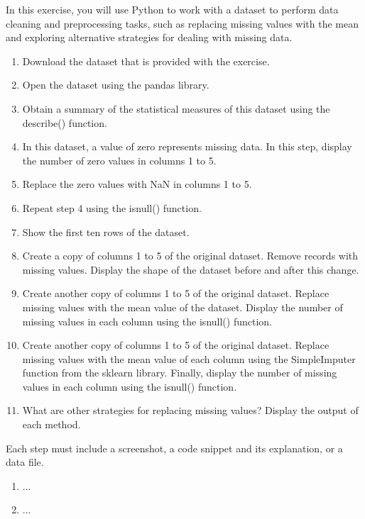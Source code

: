 \begin{question}
	In this exercise, you will use Python to work with a dataset to perform data cleaning and preprocessing tasks, such as replacing missing values with the mean and exploring alternative strategies for dealing with missing data.
	\begin{enumerate}
		\item Download the dataset that is provided with the exercise.
		\item Open the dataset using the pandas library.
		\item Obtain a summary of the statistical measures of this dataset using the describe() function.
		\item In this dataset, a value of zero represents missing data. In this step, display the number of zero values in columns 1 to 5.
		\item Replace the zero values with NaN in columns 1 to 5.
		\item Repeat step 4 using the isnull() function.
		\item Show the first ten rows of the dataset.
		\item Create a copy of columns 1 to 5 of the original dataset. Remove records with missing values. Display the shape of the dataset before and after this change.
		\item Create another copy of columns 1 to 5 of the original dataset. Replace missing values with the mean value of the dataset. Display the number of missing values in each column using the isnull() function.
		\item Create another copy of columns 1 to 5 of the original dataset. Replace missing values with the mean value of each column using the SimpleImputer function from the sklearn library. Finally, display the number of missing values in each column using the isnull() function.
		\item What are other strategies for replacing missing values? Display the output of each method.
	\end{enumerate}
\end{question}

\pagebreak
\begin{answer}
	Each step must include a screenshot, a code snippet and its explanation, or a data file.
	\begin{enumerate}     
		\item ... 
		
		\item ... 
	\end{enumerate}
\end{answer}

